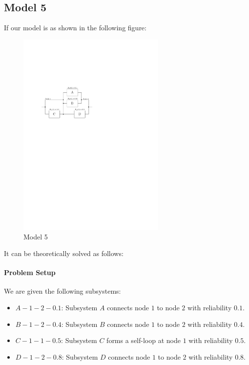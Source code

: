 \documentclass[12pt	]{article}
\begin{document}
\subsection{Model 5}
If our model is as shown in the following figure:

\begin{figure}[h]
	\centering
	\includegraphics[width=0.65\textwidth]{Images/img6.pdf}
	\caption{Model 5}
	\label{fig:Model 5}
\end{figure}

It can be theoretically solved as follows:

\paragraph{Problem Setup}
We are given the following subsystems:
\begin{itemize}
	\item $A-1-2-0.1$: Subsystem $A$ connects node $1$ to node $2$ with reliability $0.1$.
	\item $B-1-2-0.4$: Subsystem $B$ connects node $1$ to node $2$ with reliability $0.4$.
	\item $C-1-1-0.5$: Subsystem $C$ forms a self-loop at node $1$ with reliability $0.5$.
	\item $D-1-2-0.8$: Subsystem $D$ connects node $1$ to node $2$ with reliability $0.8$.
\end{itemize}
\end{document}
